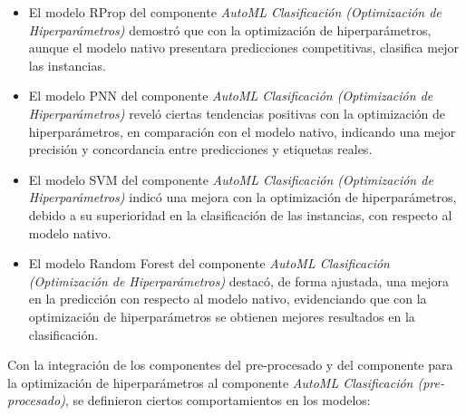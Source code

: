 \begin{itemize}
	\item El modelo RProp del componente \textit{AutoML Clasificación (Optimización de Hiperparámetros)} demostró que con la optimización de hiperparámetros, aunque el modelo nativo presentara predicciones competitivas, clasifica mejor las instancias.
	\item El modelo PNN del componente \textit{AutoML Clasificación (Optimización de Hiperparámetros)} reveló ciertas tendencias positivas con la optimización de hiperparámetros, en comparación con el modelo nativo, indicando una mejor precisión y concordancia entre predicciones y etiquetas reales.
	\item El modelo SVM del componente \textit{AutoML Clasificación (Optimización de Hiperparámetros)} indicó una mejora con la optimización de hiperparámetros, debido a su superioridad en la clasificación de las instancias, con respecto al modelo nativo.
	\item El modelo Random Forest del componente \textit{AutoML Clasificación (Optimización de Hiperparámetros)} destacó, de forma ajustada, una mejora en la predicción con respecto al modelo nativo, evidenciando que con la optimización de hiperparámetros se obtienen mejores resultados en la clasificación. 
\end{itemize}
	Con la integración de los componentes del pre-procesado y del componente para la optimización de hiperparámetros al componente \textit{AutoML Clasificación (pre-procesado)}, se definieron ciertos comportamientos en los modelos: 
